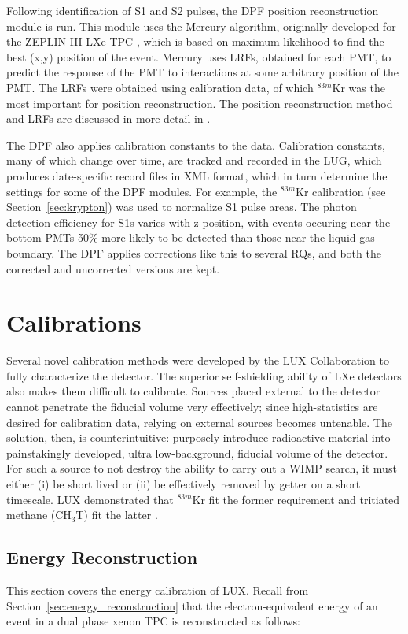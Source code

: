 Following identification of S1 and S2 pulses, the \ac{DPF} position reconstruction module is run. This module uses the Mercury algorithm, originally developed for the ZEPLIN-III \ac{LXe} \ac{TPC} \cite{Currie2012}, which is based on maximum-likelihood to find the best (x,y) position of the event. Mercury uses \ac{LRF}s, obtained for each \ac{PMT}, to predict the response of the \ac{PMT} to interactions at some arbitrary position of the \ac{PMT}. The \ac{LRF}s were obtained using calibration data, of which $^{83m}$Kr was the most important for position reconstruction. The position reconstruction method and \ac{LRF}s are discussed in more detail in \cite{LUXPositionReconstruction}.


The \ac{DPF} also applies calibration constants to the data. Calibration constants, many of which change over time, are tracked and recorded in the \ac{LUG}, which produces date-specific record files in XML format, which in turn determine the settings for some of the \ac{DPF} modules. For example, the $^{83m}$Kr calibration (see Section~\ref{sec:krypton}) was used to normalize S1 pulse areas. The photon detection efficiency for S1s varies with z-position, with events occuring near the bottom \ac{PMT}s \~50\% more likely to be detected than those near the liquid-gas boundary. The \ac{DPF} applies corrections like this to several RQs, and both the corrected and uncorrected versions are kept. 


\section{Calibrations}
Several novel calibration methods were developed by the \ac{LUX} Collaboration to fully characterize the detector. The superior self-shielding ability of \ac{LXe} detectors also makes them difficult to calibrate. Sources placed external to the detector cannot penetrate the fiducial volume very effectively; since high-statistics are desired for calibration data, relying on external sources becomes untenable. The solution, then, is counterintuitive: purposely introduce radioactive material into painstakingly developed, ultra low-background, fiducial volume of the detector. For such a source to not destroy the ability to carry out a \ac{WIMP} search, it must either (i) be short lived or (ii) be effectively removed by getter on a short timescale. \ac{LUX} demonstrated that $^{83m}$Kr fit the former \cite{LUXKr} requirement and tritiated methane (CH$_{3}$T) fit the latter \cite{LUXTritium}.

\subsection{Energy Reconstruction}
This section covers the energy calibration of \ac{LUX}. Recall from Section~\ref{sec:energy_reconstruction} that the electron-equivalent energy of an event in a dual phase xenon \ac{TPC} is reconstructed as follows:

